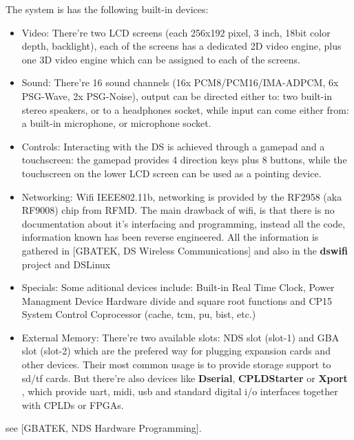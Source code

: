 \documentclass[11pt]{p9article}
\begin{document}
The system is has the following built-in devices:

\begin{itemize}
	\item Video:
	There're two LCD screens (each 256x192 pixel, 3 inch, 18bit color depth, backlight),
	each of the screens has a dedicated 2D video engine, plus one 3D video engine which
	can be assigned to each of the screens.
	
	\item Sound:
	There're 16 sound channels (16x PCM8/PCM16/IMA-ADPCM, 6x PSG-Wave, 2x PSG-Noise),
	output can be directed either to: two built-in stereo speakers, or to a headphones socket,
	while input can come either from: a built-in microphone, or microphone socket.
	
	\item Controls:
	Interacting with the DS is achieved through a gamepad and a touchscreen:
	the gamepad provides 4 direction keys plus 8 buttons,
	while the touchscreen on the lower LCD screen can be used as a pointing device.

	\item Networking:
	Wifi IEEE802.11b,  networking is provided by the RF2958 (aka RF9008) chip from RFMD.
	The main drawback of wifi, is that there is no documentation about it's  interfacing and
	 programming, instead all the code, information known has been reverse engineered.
	All the information is gathered in \cite{gbatek}[GBATEK, DS Wireless Communications]
	and also in the \textbf{dswifi} project and DSLinux \cite{DSLinux}

	\item Specials:
	Some aditional devices include: 
	Built-in Real Time Clock, Power Managment Device Hardware divide and square root functions
	and  CP15 System Control Coprocessor (cache, tcm, pu, bist, etc.)

	\item External Memory:
	There're two available slots: NDS slot (slot-1) and GBA slot (slot-2)
	which are the prefered way for plugging expansion cards and other devices.
	Their most common usage is to provide storage support to sd/tf cards.
	But there're also devices like \textbf{Dserial}, \textbf{CPLDStarter} or \textbf{Xport} \cite{xport},
	which provide uart, midi, usb and standard digital i/o interfaces together with CPLDs or FPGAs.
	
\end{itemize}

see \cite{gbatek}[GBATEK, NDS Hardware Programming].
\end{document}
